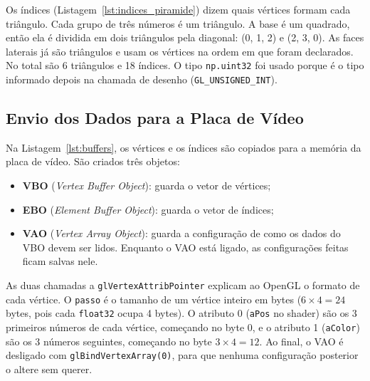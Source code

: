 \documentclass{article}
\begin{document}
Os índices (Listagem~\ref{lst:indices_piramide}) dizem quais vértices formam cada triângulo. Cada grupo de três números é um triângulo. A base é um quadrado, então ela é dividida em dois triângulos pela diagonal: (0, 1, 2) e (2, 3, 0). As faces laterais já são triângulos e usam os vértices na ordem em que foram declarados. No total são 6 triângulos e 18 índices. O tipo \texttt{np.uint32} foi usado porque é o tipo informado depois na chamada de desenho (\texttt{GL\_UNSIGNED\_INT}).



\subsection{Envio dos Dados para a Placa de Vídeo}

Na Listagem~\ref{lst:buffers}, os vértices e os índices são copiados para a memória da placa de vídeo. São criados três objetos:

\begin{itemize}
    \item \textbf{VBO} (\textit{Vertex Buffer Object}): guarda o vetor de vértices;
    \item \textbf{EBO} (\textit{Element Buffer Object}): guarda o vetor de índices;
    \item \textbf{VAO} (\textit{Vertex Array Object}): guarda a configuração de como os dados do VBO devem ser lidos. Enquanto o VAO está ligado, as configurações feitas ficam salvas nele.
\end{itemize}

As duas chamadas a \texttt{glVertexAttribPointer} explicam ao OpenGL o formato de cada vértice. O \texttt{passo} é o tamanho de um vértice inteiro em bytes ($6 \times 4 = 24$ bytes, pois cada \texttt{float32} ocupa 4 bytes). O atributo 0 (\texttt{aPos} no shader) são os 3 primeiros números de cada vértice, começando no byte 0, e o atributo 1 (\texttt{aColor}) são os 3 números seguintes, começando no byte $3 \times 4 = 12$. Ao final, o VAO é desligado com \texttt{glBindVertexArray(0)}, para que nenhuma configuração posterior o altere sem querer.


\end{document}
